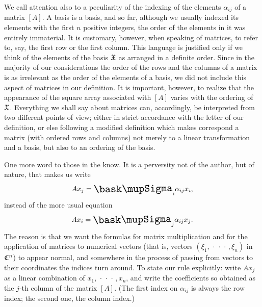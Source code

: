 We call attention also to a peculiarity of the indexing of the elements
\(\alpha_{ij}\) of a matrix \([A]\). A basis is a basis, and so far, although we
usually indexed its elements with the first \(n\) positive integers, the order
of the elements in it was entirely immaterial. It is customary, however, when
speaking of matrices, to refer to, say, the first row or the first column. This
language is justified only if we think of the elements of the basis \(\frak{X}\)
as arranged in a definite order. Since in the majority of our considerations the
order of the rows and the columns of a matrix is as irrelevant as the order of
the elements of a basis, we did not include this aspect of matrices in our
definition. It is important, however, to realize that the appearance of the
square array associated with \([A]\) varies with the ordering of \(\frak{X}\).
Everything we shall say about matrices can, accordingly, be interpreted from two
different points of view; either in strict accordance with the letter of our
definition, or else following a modified definition which makes correspond a
matrix (with ordered rows and columns) not merely to a linear transformation and
a basis, but also to an ordering of the basis.

One more word to those in the know. It is a perversity not of the author, but of
nature, that makes us write
\begin{equation*}
    Ax_j = {\textstyle \sumx_i} \alpha_{ij} x_i,
\end{equation*}
instead of the more usual equation
\begin{equation*}
    Ax_i = {\textstyle \sumx_j} \alpha_{ij} x_j.
\end{equation*}
The reason is that we want the formulas for matrix multiplication and for
the application of matrices to numerical vectors (that is, vectors \((\xi_1, \,\cdot\,\cdot\,\cdot\,, \xi_n)\) in \(\mathfrak{C}^n\)) to appear normal, and somewhere in the process of passing from vectors to their coordinates the indices turn around. To state our rule explicitly: write \(Ax_j\) as a linear combination of \(x_1, \,\cdot\,\cdot\,\cdot\,, x_n\), and write the coefficients so obtained as the \(j\)-th column of the matrix \([A]\). (The first index on \(\alpha_{ij}\) is always the row index; the second one, the column index.)

